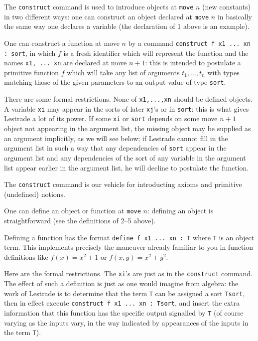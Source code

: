 \documentclass[12pt]{article}
\begin{document}
The {\tt construct} command is used to introduce objects at {\tt move} $n$ (new constants) in two different ways:  one can construct an object declared at {\tt move} $n$ in basically the same way one declares a variable (the declaration of 1 above is an example).  

One can construct a function at move $n$
by a command {\tt construct f x1 ... xn : sort}, in which $f$ is a fresh identifier which will represent the function and the names {\tt x1, ... xn} are declared at move $n+1$:  this is intended to postulate a primitive function $f$ which will take any list of arguments $t_1,\ldots,t_n$ with types matching those of the given parameters to an output value of type {\tt sort}.   

There are some formal restrictions.  None of {\tt x1,...,xn} should be defined objects.  A variable {\tt xi} may appear in the sorts of later {\tt xj}'s or in {\tt sort}:  this is what gives Lestrade a lot of its power.  If some {\tt xi} or {\tt sort} depends on some move $n+1$ object not appearing in the argument list, the missing object may be supplied as an argument implicitly, as we will see below; if Lestrade cannot fill in the argument list in such a way that any dependencies of {\tt sort}
appear in the argument list and any dependencies of the sort of any variable in the argument list appear earlier in the argument list, he will decline to postulate the function.

The {\tt construct} command is our vehicle for introducting axioms and primitive (undefined) notions.

One can define an object or function at {\tt move} $n$:  defining an object is straightforward (see the definitions of 2--5 above).  

Defining a function
has the format {\tt define f x1 ... xn : T} where {\tt T} is an object term.   This implements precisely the maneuver already familiar to you in function definitions like $f(x) = x^2+1$ or $f(x,y)=x^2+y^2$.

Here are the formal restrictions.  The {\tt xi}'s are just as in the {\tt construct} command.  The effect of such a definition is just as one would imagine from algebra:  the work of Lestrade is to determine that the term {\tt T} can be assigned a sort {\tt Tsort},
then in effect execute {\tt construct f x1 ... xn : Tsort}, and insert the extra information that this function has the specific output signalled by {\tt T} (of course varying as the inputs vary, in the way indicated by appearances of the inputs in the term {\tt T}).
\end{document}
